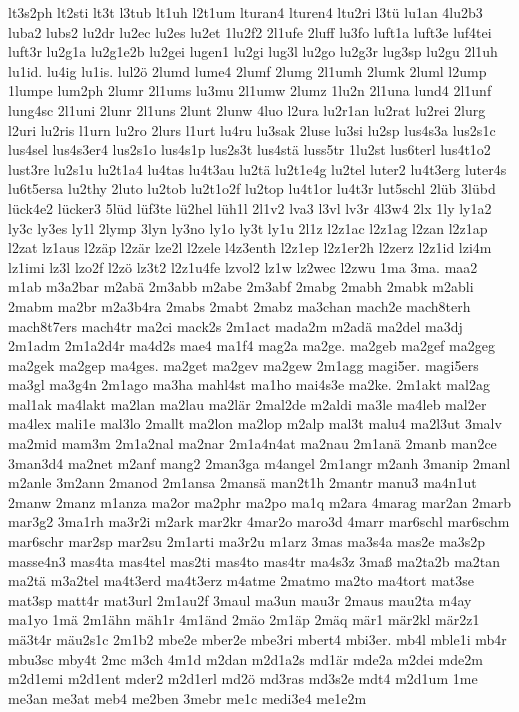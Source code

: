 {lt3s2ph
lt2sti
lt3t
l3tub
lt1uh
l2t1um
lturan4
lturen4
ltu2ri
l3tü
lu1an
4lu2b3
luba2
lubs2
lu2dr
lu2ec
lu2es
lu2et
1lu2f2
2l1ufe
2luff
lu3fo
luft1a
luft3e
luf4tei
luft3r
lu2g1a
lu2g1e2b
lu2gei
lugen1
lu2gi
lug3l
lu2go
lu2g3r
lug3sp
lu2gu
2l1uh
lu1id.
lu4ig
lu1is.
lul2ö
2lumd
lume4
2lumf
2lumg
2l1umh
2lumk
2luml
l2ump
1lumpe
lum2ph
2lumr
2l1ums
lu3mu
2l1umw
2lumz
1lu2n
2l1una
lund4
2l1unf
lung4sc
2l1uni
2lunr
2l1uns
2lunt
2lunw
4luo
l2ura
lu2r1an
lu2rat
lu2rei
2lurg
l2uri
lu2ris
l1urn
lu2ro
2lurs
l1urt
lu4ru
lu3sak
2luse
lu3si
lu2sp
lus4s3a
lus2s1c
lus4sel
lus4s3er4
lus2s1o
lus4s1p
lus2s3t
lus4stä
luss5tr
1lu2st
lus6terl
lus4t1o2
lust3re
lu2s1u
lu2t1a4
lu4tas
lu4t3au
lu2tä
lu2t1e4g
lu2tel
luter2
lu4t3erg
luter4s
lu6t5ersa
lu2thy
2luto
lu2tob
lu2t1o2f
lu2top
lu4t1or
lu4t3r
lut5schl
2lüb
3lübd
lück4e2
lücker3
5lüd
lüf3te
lü2hel
lüh1l
2l1v2
lva3
l3vl
lv3r
4l3w4
2lx
1ly
ly1a2
ly3c
ly3es
ly1l
2lymp
3lyn
ly3no
ly1o
ly3t
ly1u
2l1z
l2z1ac
l2z1ag
l2zan
l2z1ap
l2zat
lz1aus
l2zäp
l2zär
lze2l
l2zele
l4z3enth
l2z1ep
l2z1er2h
l2zerz
l2z1id
lzi4m
lz1imi
lz3l
lzo2f
l2zö
lz3t2
l2z1u4fe
lzvol2
lz1w
lz2wec
l2zwu
1ma
3ma.
maa2
m1ab
m3a2bar
m2abä
2m3abb
m2abe
2m3abf
2mabg
2mabh
2mabk
m2abli
2mabm
ma2br
m2a3b4ra
2mabs
2mabt
2mabz
ma3chan
mach2e
mach8terh
mach8t7ers
mach4tr
ma2ci
mack2s
2m1act
mada2m
m2adä
ma2del
ma3dj
2m1adm
2m1a2d4r
ma4d2s
mae4
ma1f4
mag2a
ma2ge.
ma2geb
ma2gef
ma2geg
ma2gek
ma2gep
ma4ges.
ma2get
ma2gev
ma2gew
2m1agg
magi5er.
magi5ers
ma3gl
ma3g4n
2m1ago
ma3ha
mahl4st
ma1ho
mai4s3e
ma2ke.
2m1akt
mal2ag
mal1ak
ma4lakt
ma2lan
ma2lau
ma2lär
2mal2de
m2aldi
ma3le
ma4leb
mal2er
ma4lex
mali1e
mal3lo
2mallt
ma2lon
ma2lop
m2alp
mal3t
malu4
ma2l3ut
3malv
ma2mid
mam3m
2m1a2nal
ma2nar
2m1a4n4at
ma2nau
2m1anä
2manb
man2ce
3man3d4
ma2net
m2anf
mang2
2man3ga
m4angel
2m1angr
m2anh
3manip
2manl
m2anle
3m2ann
2manod
2m1ansa
2mansä
man2t1h
2mantr
manu3
ma4n1ut
2manw
2manz
m1anza
ma2or
ma2phr
ma2po
ma1q
m2ara
4marag
mar2an
2marb
mar3g2
3ma1rh
ma3r2i
m2ark
mar2kr
4mar2o
maro3d
4marr
mar6schl
mar6schm
mar6schr
mar2sp
mar2su
2m1arti
ma3r2u
m1arz
3mas
ma3s4a
mas2e
ma3s2p
masse4n3
mas4ta
mas4tel
mas2ti
mas4to
mas4tr
ma4s3z
3maß
ma2ta2b
ma2tan
ma2tä
m3a2tel
ma4t3erd
ma4t3erz
m4atme
2matmo
ma2to
ma4tort
mat3se
mat3sp
matt4r
mat3url
2m1au2f
3maul
ma3un
mau3r
2maus
mau2ta
m4ay
ma1yo
1mä
2m1ähn
mäh1r
4m1änd
2mäo
2m1äp
2mäq
mär1
mär2kl
mär2z1
mä3t4r
mäu2s1c
2m1b2
mbe2e
mber2e
mbe3ri
mbert4
mbi3er.
mb4l
mble1i
mb4r
mbu3sc
mby4t
2mc
m3ch
4m1d
m2dan
m2d1a2s
md1är
mde2a
m2dei
mde2m
m2d1emi
m2d1ent
mder2
m2d1erl
md2ö
md3ras
md3s2e
mdt4
m2d1um
1me
me3an
me3at
meb4
me2ben
3mebr
me1c
medi3e4
me1e2m
}

